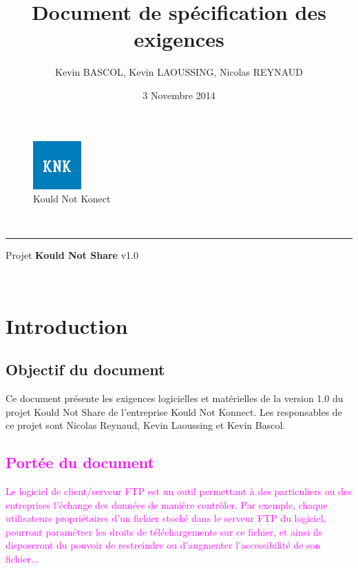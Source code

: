 \documentclass[10pt,a4paper]{report}
\author{Kevin BASCOL, Kevin LAOUSSING, Nicolas REYNAUD}
\title{Document de spécification des exigences}
\date{3 Novembre 2014}
\begin{document}
\makeatletter
	\begin{titlepage}
	
	\begin{figure}
		\begin{minipage}[c]{.46\linewidth}
		\end{minipage} \hfill
		\begin{minipage}[c]{.20\linewidth}
			\begin{center}
				\includegraphics{knk.png}\\
				{\large Kould Not Konect}
			\end{center}
		\end{minipage}
	\vspace{1cm}
	\end{figure}
	
	\centering
		{\Huge \textbf{\@title}}\\
		\hrule height 4pt
		\vspace{1.5cm}
		{\LARGE  Projet \textbf{Kould Not Share} v1.0}
		
		\vfill
		
		\@author\\
		\@date 
		\end{titlepage}
\makeatother
\setcounter{secnumdepth}{4}
\setcounter{tocdepth}{4}
\renewcommand{\contentsname}{Sommaire}
\tableofcontents
\thispagestyle{empty}
\setcounter{page}{0}
\newpage


\section{Introduction}

\subsection{Objectif du document}
Ce document présente les exigences logicielles et matérielles de la version 1.0 du projet Kould Not Share de l'entreprise Kould Not Konnect. Les responsables de ce projet sont Nicolas Reynaud, Kevin Laoussing et Kevin Bascol.

\textcolor{magenta}{\subsection{Portée du document}
Le logiciel de client/serveur FTP est un outil permettant à des particuliers ou des entreprises l'échange des données de manière contrôler. Par exemple, chaque utilisateurs propriétaires d'un fichier stocké dans le serveur FTP du logiciel, pourront paramétrer les droits de téléchargements sur ce fichier, et ainsi ils disposeront du pouvoir de restreindre ou d'augmenter l'accessibilité de son fichier...
}
\end{document}
